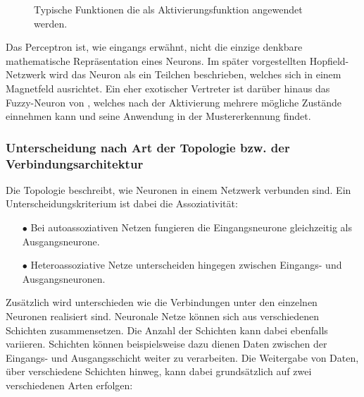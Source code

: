 \begin{figure}[!htb]
    \centering
    
    
    \caption[Typische Aktivierungsfunktionen]{Typische Funktionen die als Aktivierungsfunktion angewendet werden.\protect\footnotemark{}}
    \label{fig:funktion}
\end{figure}
\addtocounter{footnote}{-1}     %
\addtocounter{Hfootnote}{-1}    %
\wrapfigfoot{}

Das Perceptron ist, wie eingangs erwähnt, nicht die einzige denkbare mathematische Repräsentation eines Neurons. Im später vorgestellten Hopfield-Netzwerk wird das Neuron als ein Teilchen beschrieben, welches sich in einem Magnetfeld ausrichtet. Ein eher exotischer Vertreter ist darüber hinaus das Fuzzy-Neuron von \citet{fuzzy-neuron}, welches nach der Aktivierung mehrere mögliche Zustände einnehmen kann und seine Anwendung in der Mustererkennung findet. 



\subsubsection{Unterscheidung nach Art der Topologie bzw. der Verbindungsarchitektur}

Die Topologie beschreibt, wie Neuronen in einem Netzwerk verbunden sind. Ein Unterscheidungskriterium ist dabei die Assoziativität:
\begin{itemize}
\item[\textbf{$\bullet$}] Bei autoassoziativen Netzen fungieren die Eingangsneurone gleichzeitig als Ausgangsneurone.

\item[\textbf{$\bullet$}] Heteroassoziative Netze unterscheiden hingegen zwischen Eingangs- und Ausgangsneuronen.
\end{itemize}

Zusätzlich wird unterschieden wie die Verbindungen unter den einzelnen Neuronen realisiert sind. Neuronale Netze können sich aus verschiedenen Schichten zusammensetzen. Die Anzahl der Schichten kann dabei ebenfalls variieren. Schichten können beispielsweise dazu dienen Daten zwischen der Eingangs- und Ausgangsschicht weiter zu verarbeiten. Die Weitergabe von Daten, über verschiedene Schichten hinweg, kann dabei grundsätzlich auf zwei verschiedenen Arten erfolgen:\,

